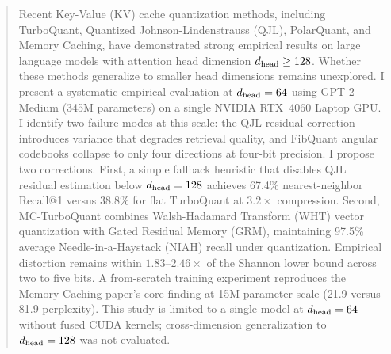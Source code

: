 
\begin{abstract}
Recent Key-Value (KV) cache quantization
methods, including TurboQuant, Quantized Johnson-Lindenstrauss (QJL), PolarQuant,
and Memory Caching, have demonstrated strong empirical results on large
language models with attention head dimension $\dhead \geq 128$.
Whether these methods generalize to smaller head dimensions remains
unexplored.
%
I present a systematic empirical evaluation at $\dhead = 64$ using
GPT-2 Medium (345M parameters) on a single NVIDIA RTX~4060 Laptop GPU.
I identify two failure modes at this scale: the QJL residual correction
introduces variance that degrades retrieval quality, and FibQuant angular
codebooks collapse to only four directions at four-bit precision.
%
I propose two corrections.
First, a simple fallback heuristic that disables QJL residual estimation below
$\dhead = 128$ achieves 67.4\% nearest-neighbor Recall@1 versus 38.8\%
for flat TurboQuant at $3.2{\times}$ compression.
Second, MC-TurboQuant combines Walsh-Hadamard Transform (WHT) vector
quantization with Gated Residual Memory (GRM), maintaining 97.5\%
average Needle-in-a-Haystack (NIAH) recall under quantization.
%
Empirical distortion remains within $1.83$--$2.46{\times}$ of the
Shannon lower bound across two to five bits.
A from-scratch training experiment reproduces the Memory Caching paper's
core finding at 15M-parameter scale (21.9 versus 81.9 perplexity).
%
This study is limited to a single model at $\dhead = 64$ without fused
CUDA kernels; cross-dimension generalization to $\dhead = 128$ was not
evaluated.
\end{abstract}
